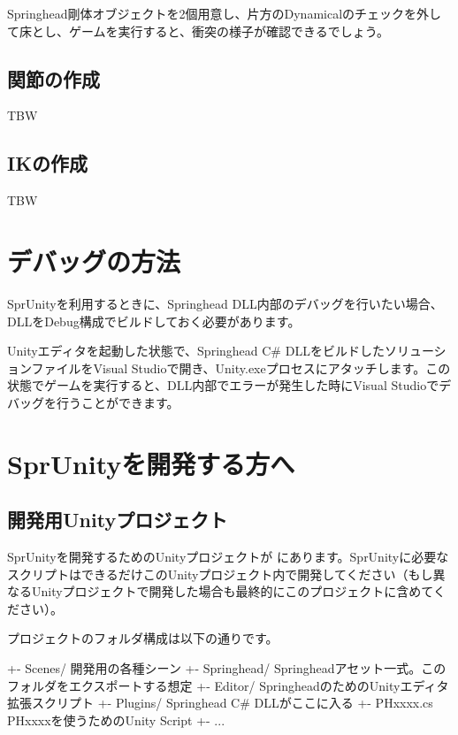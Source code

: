 Springhead\KLUDGE 剛体オブジェクトを2\KLUDGE 個用意し、片方のDynamical\KLUDGE のチェックを外して床とし、ゲームを実行すると、衝突の様子が確認できるでしょう。


\subsection{\KLUDGE 関節の作成}

TBW

\subsection{IK\KLUDGE の作成}

TBW



\section{\KLUDGE デバッグの方法}

SprUnity\KLUDGE を利用するときに、Springhead DLL\KLUDGE 内部のデバッグを行いたい場合、DLL\KLUDGE をDebug\KLUDGE 構成でビルドしておく必要があります。

Unity\KLUDGE エディタを起動した状態で、Springhead C\# DLL\KLUDGE をビルドしたソリューションファイルをVisual Studio\KLUDGE で開き、Unity.exe\KLUDGE プロセスにアタッチします。この状態でゲームを実行すると、DLL\KLUDGE 内部でエラーが発生した時にVisual Studio\KLUDGE でデバッグを行うことができます。



\section{SprUnity\KLUDGE を開発する方へ}

\subsection{\KLUDGE 開発用Unity\KLUDGE プロジェクト}

SprUnity\KLUDGE を開発するためのUnity\KLUDGE プロジェクトが  \KLUDGE にあります。SprUnity\KLUDGE に必要なスクリプトはできるだけこのUnity\KLUDGE プロジェクト内で開発してください（もし異なるUnity\KLUDGE プロジェクトで開発した場合も最終的にこのプロジェクトに含めてください）。

\KLUDGE プロジェクトのフォルダ構成は以下の通りです。
\begin{sourcecode}
+- Scenes/         開発用の各種シーン
+- Springhead/     Springheadアセット一式。このフォルダをエクスポートする想定
   +- Editor/      SpringheadのためのUnityエディタ拡張スクリプト
   +- Plugins/     Springhead C# DLLがここに入る
   +- PHxxxx.cs    PHxxxxを使うためのUnity Script
   +- ...
\end{sourcecode}

